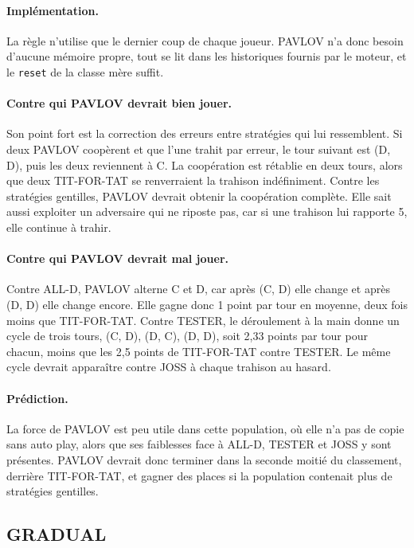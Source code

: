 \documentclass[11pt,a4paper]{article}
\begin{document}
\paragraph{Implémentation.} La règle n'utilise que le dernier coup de chaque joueur. PAVLOV n'a donc besoin d'aucune mémoire
propre, tout se lit dans les historiques fournis par le moteur, et le \texttt{reset} de la classe mère suffit.

\paragraph{Contre qui PAVLOV devrait bien jouer.} Son point fort est la correction des erreurs entre stratégies qui lui
ressemblent. Si deux PAVLOV coopèrent et que l'une trahit par erreur, le tour suivant est (D, D), puis les deux reviennent à
C. La coopération est rétablie en deux tours, alors que deux TIT-FOR-TAT se renverraient la trahison indéfiniment. Contre les
stratégies gentilles, PAVLOV devrait obtenir la coopération complète. Elle sait aussi exploiter un adversaire qui ne riposte
pas, car si une trahison lui rapporte 5, elle continue à trahir.

\paragraph{Contre qui PAVLOV devrait mal jouer.} Contre ALL-D, PAVLOV alterne C et D, car après (C, D) elle change et après
(D, D) elle change encore. Elle gagne donc 1 point par tour en moyenne, deux fois moins que TIT-FOR-TAT. Contre TESTER, le
déroulement à la main donne un cycle de trois tours, (C, D), (D, C), (D, D), soit 2,33 points par tour pour chacun, moins que
les 2,5 points de TIT-FOR-TAT contre TESTER. Le même cycle devrait apparaître contre JOSS à chaque trahison au hasard.

\paragraph{Prédiction.} La force de PAVLOV est peu utile dans cette population, où elle n'a pas de copie sans auto play, alors
que ses faiblesses face à ALL-D, TESTER et JOSS y sont présentes. PAVLOV devrait donc terminer dans la seconde moitié du
classement, derrière TIT-FOR-TAT, et gagner des places si la population contenait plus de stratégies gentilles.

\subsection{GRADUAL}
\end{document}
